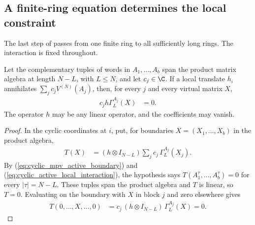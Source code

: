 \subsection{A finite-ring equation determines the local constraint}

The last step of \cite[Theorem~5]{Sanz2010Quantum} passes from one finite
ring to all sufficiently long rings. The interaction is fixed throughout.

\begin{lemma}
    \label{lem:local_weighted_boundary_annihilation}
    \leanok
    Let the complementary tuples of words in $A_1,\ldots,A_b$ span the
    product matrix algebra at length $N-L$, with $L\le N$, and let $c_j\in\C$.
    If a local translate $h_i$ annihilates $\sum_jc_jV^{(N)}(A_j)$, then,
    for every $j$ and every virtual matrix $X$,
    \begin{align}
        c_jh\Gamma_L^{A_j}(X) & =0.
        \label{eq:local_weighted_boundary_annihilation}
    \end{align}
    The operator $h$ may be any linear operator, and the coefficients may vanish.
\end{lemma}
\begin{proof}\leanok
    In the cyclic coordinates at $i$, put, for boundaries
    $X=(X_1,\ldots,X_b)$ in the product algebra,
    \begin{align}
        T(X) & =(h\otimes I_{N-L})\sum_jc_j\,\Gamma_L^{A_j}(X_j).
        \label{eq:local_weighted_boundary_joint_map}
    \end{align}
    By (\ref{eq:cyclic_mpv_active_boundary}) and
    (\ref{eq:cyclic_active_local_interaction}), the hypothesis says
    $T(A_1^\tau,\ldots,A_b^\tau)=0$ for every $|\tau|=N-L$. These tuples
    span the product algebra and $T$ is linear, so $T=0$. Evaluating on the
    boundary with $X$ in block $j$ and zero elsewhere gives
    \begin{align}
        T(0,\ldots,X,\ldots,0) & =c_j\,(h\otimes I_{N-L})\,\Gamma_L^{A_j}(X)=0.
        \label{eq:local_weighted_boundary_single_block}
    \end{align}
\end{proof}


